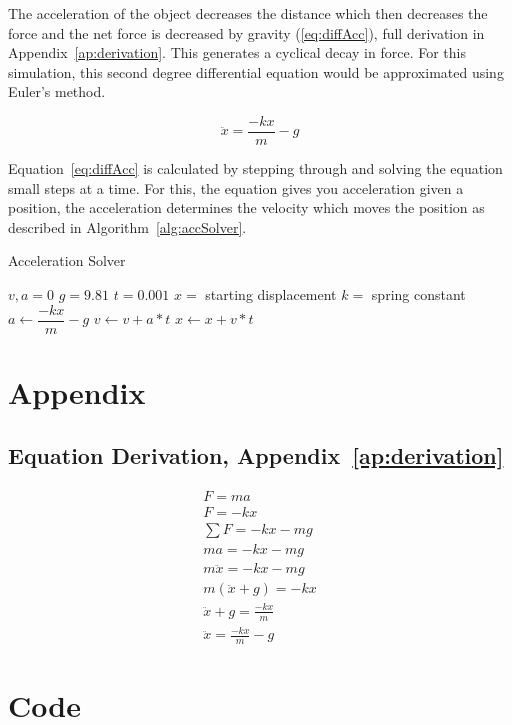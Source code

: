 \documentclass[12pt, letterpaper]{article}
\begin{document}
The acceleration of the object decreases the distance which then decreases the force and the net force is
decreased by gravity (\ref{eq:diffAcc}), full derivation in Appendix~\ref{ap:derivation}. This generates a 
cyclical decay in force. For this simulation, this second degree differential equation would be approximated 
using Euler's method.

\begin{equation}
  \label{eq:diffAcc}
  \ddot{x} = \frac{-kx}{m} -g
\end{equation}

Equation~\ref{eq:diffAcc} is calculated by stepping through and solving the equation small steps at a time.
For this, the equation gives you acceleration given a position, the acceleration determines the velocity
which moves the position as described in Algorithm~\ref{alg:accSolver}.

\begin{algorithm}
\caption{Acceleration Solver}
\begin{algorithmic} 
\label{alg:accSolver}
\REQUIRE $v, a = 0$
\REQUIRE $g = 9.81$
\REQUIRE $t = 0.001$
\REQUIRE $x =$ starting displacement
\REQUIRE $k =$ spring constant
\STATE $a \leftarrow \dfrac{-kx}{m} - g$
\STATE $v \leftarrow v + a * t$
\STATE $x \leftarrow x + v * t$
\ENDWHILE
\end{algorithmic}
\end{algorithm}

\newpage{}
\printbibliography{}

\newpage{}
\section{Appendix}
\listoffigures{}


\begin{singlespace}
\subsection*{Equation Derivation, Appendix~\ref{ap:derivation}}
\label{ap:derivation}
\begin{gather*}
  F = ma \\
  F = -kx \\
  \sum F = -kx - mg \\
  ma = -kx - mg \\
  m\ddot{x} = -kx - mg \\
  m(\ddot{x} + g) = -kx \\
  \ddot{x} + g = \frac{-kx}{m} \\
  \ddot{x} = \frac{-kx}{m} - g
\end{gather*}
\end{singlespace}

\section*{Code}

\end{document}
